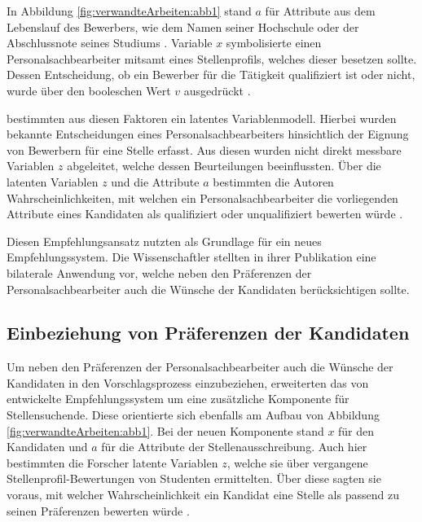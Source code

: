 In Abbildung \ref{fig:verwandteArbeiten:abb1} stand $a$ für Attribute aus dem Lebenslauf des Bewerbers, wie dem Namen seiner Hochschule oder der Abschlussnote seines Studiums \cite[S. 4]{malinowski:2006}. Variable $x$ symbolisierte einen Personalsachbearbeiter mitsamt eines Stellenprofils, welches dieser besetzen sollte. Dessen Entscheidung, ob ein Bewerber für die Tätigkeit qualifiziert ist oder nicht, wurde über den booleschen Wert $v$ ausgedrückt \cite[S. 6ff.]{faerber:2003}.

\textcite[S. 4ff.]{faerber:2003} bestimmten aus diesen Faktoren ein latentes Variablenmodell. Hierbei wurden bekannte Entscheidungen eines Personalsachbearbeiters hinsichtlich der Eignung von Bewerbern für eine Stelle erfasst. Aus diesen wurden nicht direkt messbare Variablen $z$ abgeleitet, welche dessen Beurteilungen beeinflussten. Über die latenten Variablen $z$ und die Attribute $a$ bestimmten die Autoren Wahrscheinlichkeiten, mit welchen ein Personalsachbearbeiter die vorliegenden Attribute eines Kandidaten als qualifiziert oder unqualifiziert bewerten würde \cite[S. 4ff.]{faerber:2003}.

Diesen Empfehlungsansatz nutzten \textcite[S. 4f.]{malinowski:2006} als Grundlage für ein neues Empfehlungssystem. Die Wissenschaftler stellten in ihrer Publikation eine bilaterale Anwendung vor, welche neben den Präferenzen der Personalsachbearbeiter auch die Wünsche der Kandidaten berücksichtigen sollte.

\subsection{Einbeziehung von Präferenzen der Kandidaten}
\label{ch:verwandteArbeiten:aufDemPEFitBasierendeBilateraleSysteme:einbeziehungKandidaten}
Um neben den Präferenzen der Personalsachbearbeiter auch die Wünsche der Kandidaten in den Vorschlagsprozess einzubeziehen, erweiterten \textcite[S. 4f.]{malinowski:2006} das von \textcite[S. 4ff.]{faerber:2003} entwickelte Empfehlungssystem um eine zusätzliche Komponente für Stellensuchende. Diese orientierte sich ebenfalls am Aufbau von Abbildung \ref{fig:verwandteArbeiten:abb1}. Bei der neuen Komponente stand $x$ für den Kandidaten und $a$ für die Attribute der Stellenausschreibung. Auch hier bestimmten die Forscher latente Variablen $z$, welche sie über vergangene Stellenprofil-Bewertungen von Studenten ermittelten. Über diese sagten sie voraus, mit welcher Wahrscheinlichkeit ein Kandidat eine Stelle als passend zu seinen Präferenzen bewerten würde \cite[S. 4f.]{malinowski:2006}.

